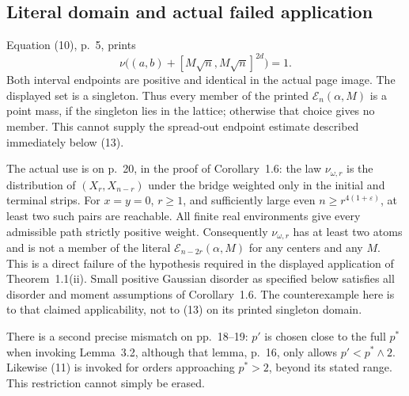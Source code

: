 \documentclass[10pt]{article}
\begin{document}
\subsection*{Literal domain and actual failed application}
Equation (10), p. 5, prints \[\nu\big((a,b)+[M\sqrt n,M\sqrt n]^{2d}\big)=1.\] Both interval endpoints are positive and identical in the actual page image. The displayed set is a singleton. Thus every member of the printed \(\mathcal E_n(\alpha,M)\) is a point mass, if the singleton lies in the lattice; otherwise that choice gives no member. This cannot supply the spread-out endpoint estimate described immediately below (13).\par
The actual use is on p. 20, in the proof of Corollary 1.6: the law \(\nu_{\omega,r}\) is the distribution of \((X_r,X_{n-r})\) under the bridge weighted only in the initial and terminal strips. For \(x=y=0\), \(r\geq1\), and sufficiently large even \(n\geq r^{4(1+\varepsilon)}\), at least two such pairs are reachable. All finite real environments give every admissible path strictly positive weight. Consequently \(\nu_{\omega,r}\) has at least two atoms and is not a member of the literal \(\mathcal E_{n-2r}(\alpha,M)\) for any centers and any \(M\). This is a direct failure of the hypothesis required in the displayed application of Theorem 1.1(ii). Small positive Gaussian disorder as specified below satisfies all disorder and moment assumptions of Corollary 1.6. The counterexample here is to that claimed applicability, not to (13) on its printed singleton domain.\par
There is a second precise mismatch on pp. 18–19: \(p'\) is chosen close to the full \(p^*\) when invoking Lemma 3.2, although that lemma, p. 16, only allows \(p'<p^*\wedge2\). Likewise (11) is invoked for orders approaching \(p^*>2\), beyond its stated range. This restriction cannot simply be erased.\par
\end{document}
